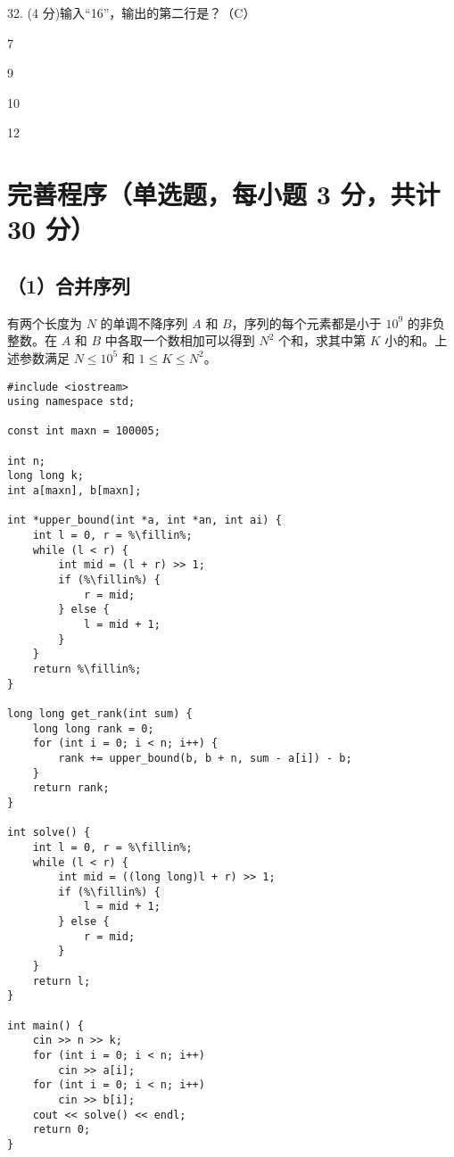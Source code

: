 \documentclass{exam-zh}
\begin{document}
    \begin{solution}

    \end{solution}


    \begin{question}
        32. (4 分)输入“16”，输出的第二行是？（C）

        \begin{choices}
            \item 7
            \item 9
            \item 10
            \item 12
        \end{choices}
    \end{question}
    
    \begin{solution}

    \end{solution}


\newpage


\section{完善程序（单选题，每小题 3 分，共计 30 分）}

\subsection*{（1）合并序列}

有两个长度为 $N$ 的单调不降序列 $A$ 和 $B$，序列的每个元素都是小于 $10^9$ 的非负整数。在 $A$ 和 $B$ 中各取一个数相加可以得到 $N^2$ 个和，求其中第 $K$ 小的和。上述参数满足 $N \le 10^5$ 和 $1 \le K \le N^2$。

\begin{lstlisting}[escapechar=\%]
#include <iostream>
using namespace std;

const int maxn = 100005;

int n;
long long k;
int a[maxn], b[maxn];

int *upper_bound(int *a, int *an, int ai) {
    int l = 0, r = %\fillin%;
    while (l < r) {
        int mid = (l + r) >> 1;
        if (%\fillin%) {
            r = mid;
        } else {
            l = mid + 1;
        }
    }
    return %\fillin%;
}

long long get_rank(int sum) {
    long long rank = 0;
    for (int i = 0; i < n; i++) {
        rank += upper_bound(b, b + n, sum - a[i]) - b;
    }
    return rank;
}

int solve() {
    int l = 0, r = %\fillin%;
    while (l < r) {
        int mid = ((long long)l + r) >> 1;
        if (%\fillin%) {
            l = mid + 1;
        } else {
            r = mid;
        }
    }
    return l;
}

int main() {
    cin >> n >> k;
    for (int i = 0; i < n; i++)
        cin >> a[i];
    for (int i = 0; i < n; i++)
        cin >> b[i];
    cout << solve() << endl;
    return 0;
}
\end{lstlisting}
\end{document}
